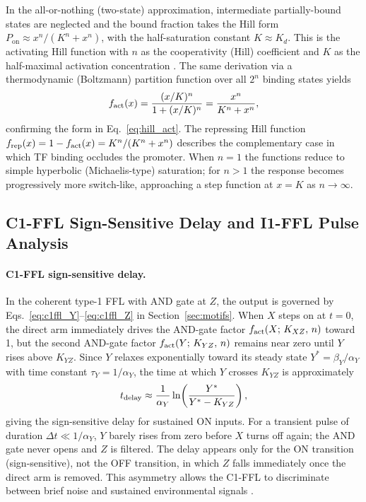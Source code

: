 In the all-or-nothing (two-state) approximation, intermediate partially-bound
states are neglected and the bound fraction takes the Hill form
$P_{\mathrm{on}} \approx x^n/(K^n + x^n)$, with the half-saturation constant
$K \approx K_d$.  This is the activating Hill function with $n$ as the cooperativity
(Hill) coefficient and $K$ as the half-maximal activation concentration
\cite{Alon2006}.  The same derivation via a thermodynamic (Boltzmann)
partition function over all $2^n$ binding states yields
\begin{equation}
  f_{\rm act}(x) = \frac{(x/K)^n}{1 + (x/K)^n} = \frac{x^n}{K^n + x^n},
\end{equation}
confirming the form in Eq.~\eqref{eq:hill_act}.  The repressing Hill function
$f_{\rm rep}(x) = 1 - f_{\rm act}(x) = K^n/(K^n + x^n)$ describes the
complementary case in which TF binding occludes the promoter.  When $n = 1$
the functions reduce to simple hyperbolic (Michaelis-type) saturation; for
$n > 1$ the response becomes progressively more switch-like, approaching a
step function at $x = K$ as $n \to \infty$.

\subsection{C1-FFL Sign-Sensitive Delay and I1-FFL Pulse Analysis}
\label{sec:c1ffl_analysis}

\paragraph{C1-FFL sign-sensitive delay.}
In the coherent type-1 FFL with AND gate at $Z$, the output is governed by
Eqs.~\eqref{eq:c1ffl_Y}--\eqref{eq:c1ffl_Z} in Section~\ref{sec:motifs}.
When $X$ steps on at $t = 0$, the direct arm immediately drives the AND-gate
factor $f_{\rm act}(X;\,K_{XZ},\,n)$ toward 1, but the second AND-gate factor
$f_{\rm act}(Y;\,K_{YZ},\,n)$ remains near zero until $Y$ rises above $K_{YZ}$.
Since $Y$ relaxes exponentially toward its steady state $Y^* = \beta_Y/\alpha_Y$
with time constant $\tau_Y = 1/\alpha_Y$, the time at which $Y$ crosses $K_{YZ}$
is approximately
\begin{equation}\label{eq:t_delay}
  t_{\rm delay} \approx \frac{1}{\alpha_Y}\ln\!\left(\frac{Y^*}{Y^* - K_{YZ}}\right),
\end{equation}
giving the sign-sensitive delay for sustained ON inputs.  For a transient
pulse of duration $\Delta t \ll 1/\alpha_Y$, $Y$ barely rises from zero before
$X$ turns off again; the AND gate never opens and $Z$ is filtered.  The delay
appears only for the ON transition (sign-sensitive), not the OFF transition, in
which $Z$ falls immediately once the direct arm is removed.  This asymmetry
allows the C1-FFL to discriminate between brief noise and sustained
environmental signals \cite{ManganAlon2003}.

